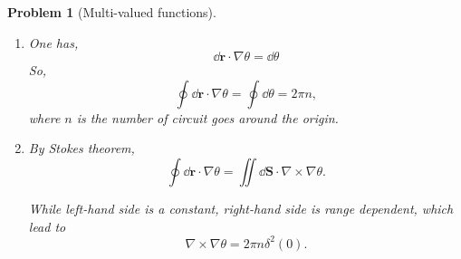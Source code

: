 \documentclass{article}
\theoremstyle{1}
\newtheorem{problem}{Problem}
\begin{document}
\begin{problem}[Multi-valued functions]
    \quad
    \begin{enumerate}

        \item One has,
        \begin{equation}
            \dd{\mathbf{r}}\cdot\nabla \theta = \dd{\theta}
        \end{equation}
        So,
        \begin{equation}
            \oint \dd{\mathbf{r}}\cdot\nabla \theta = \oint \dd{\theta } =2\pi n,
        \end{equation}
        where $n$ is the number of circuit goes around the origin.
        \item By Stokes theorem, 
        \begin{equation}
            \oint \dd{\mathbf{r}} \cdot \nabla\theta = \iint \dd{\mathbf{S}}\cdot \nabla\times\nabla\theta.
        \end{equation}
        
        While left-hand side is a constant, right-hand side is range dependent, which lead to
        \begin{equation}
            \nabla\times\nabla\theta = 2\pi n\delta^2(0).
        \end{equation}
    \end{enumerate}
\end{problem}
\end{document}
